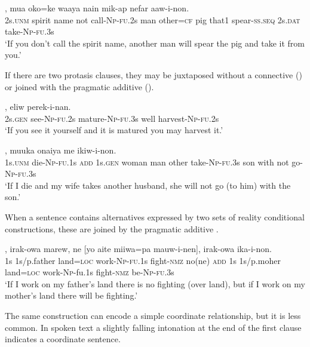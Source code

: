 \ea%
\label{ex:x1644}
,  mua  oko=ke  waaya nain  mik-ap  nefar  aaw-i-non.\\
2s.\textsc{unm} spirit  name  not  call-\textsc{Np}-\textsc{fu}.2s man  other=\textsc{cf}  pig that1  spear-\textsc{ss}.\textsc{seq} 2s.\textsc{dat} take-\textsc{Np}-\textsc{fu}.3s\\
\glt`If you don't call the spirit name, another man will spear the pig and take it from you.'
\z


If there are two protasis clauses, they may be juxtaposed without a connective () or joined with the pragmatic additive  ().

\ea%
\label{ex:x1635}
,  eliw  perek-i-nan.\\
2s.\textsc{gen} see-\textsc{Np}-\textsc{fu}.2s mature-\textsc{Np}-\textsc{fu}.3s well harvest-\textsc{Np}-\textsc{fu}.2s\\
\glt`If you see it yourself and it is matured you may harvest it.'
\z


\ea%
\label{ex:x1643}
, muuka  onaiya  me  ikiw-i-non.\\
1s.\textsc{unm} die-\textsc{Np}-\textsc{fu}.1s \textsc{add} 1s.\textsc{gen} woman  man  other take-\textsc{Np}-\textsc{fu}.3s son  with  not  go-\textsc{Np}-\textsc{fu}.3s\\
\glt`If I die and my wife takes another husband, she will not go (to him) with the son.'
\z


When a sentence contains alternatives expressed by two sets of reality conditional constructions, these are joined by the pragmatic additive .

\ea%
\label{ex:x1642}
\gll [Yo  auwa  miiwa=pa  mauw-i-nen],  irak-owa  marew,  ne [yo  aite  miiwa=pa  mauw-i-nen],  irak-owa  ika-i-non.\\
1s  1s/p.father  land=\textsc{loc} work-\textsc{Np}-\textsc{fu}.1s  fight-\textsc{nmz} no(ne) \textsc{add} 1s 1s/p.moher land=\textsc{loc}  work-\textsc{Np}-fu.1s fight-\textsc{nmz} be-\textsc{Np}-\textsc{fu}.3s\\
\glt`If I work on my father's land there is no fighting (over land), but if I work on my mother's land there will be fighting.'
\z


The same construction can encode a simple coordinate relationship, but it is less common. In spoken text a slightly falling intonation at the end of the first clause indicates a coordinate sentence.

